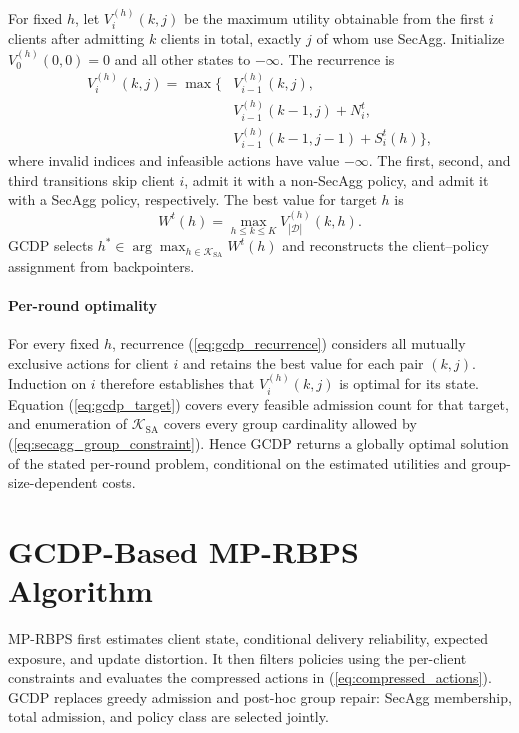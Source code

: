 \documentclass[preprint,12pt]{elsarticle}
\begin{document}
For fixed \(h\), let \(V_i^{(h)}(k,j)\) be the maximum utility obtainable from the first \(i\) clients after admitting \(k\) clients in total, exactly \(j\) of whom use SecAgg. Initialize \(V_0^{(h)}(0,0)=0\) and all other states to \(-\infty\). The recurrence is
\begin{equation}
\begin{aligned}
V_i^{(h)}(k,j)=\max\big\{&
V_{i-1}^{(h)}(k,j),\\
&V_{i-1}^{(h)}(k-1,j)+N_i^t,\\
&V_{i-1}^{(h)}(k-1,j-1)+S_i^t(h)
\big\},
\end{aligned}
\label{eq:gcdp_recurrence}
\end{equation}
where invalid indices and infeasible actions have value \(-\infty\). The first, second, and third transitions skip client \(i\), admit it with a non-SecAgg policy, and admit it with a SecAgg policy, respectively. The best value for target \(h\) is
\begin{equation}
	W^t(h)=\max_{h\leq k\leq K}V_{|\mathcal D|}^{(h)}(k,h).
	\label{eq:gcdp_target}
\end{equation}
GCDP selects \(h^*\in\arg\max_{h\in\mathcal K_{\mathrm{SA}}}W^t(h)\) and reconstructs the client--policy assignment from backpointers.

\paragraph{Per-round optimality}
For every fixed \(h\), recurrence (\ref{eq:gcdp_recurrence}) considers all mutually exclusive actions for client \(i\) and retains the best value for each pair \((k,j)\). Induction on \(i\) therefore establishes that \(V_i^{(h)}(k,j)\) is optimal for its state. Equation (\ref{eq:gcdp_target}) covers every feasible admission count for that target, and enumeration of \(\mathcal K_{\mathrm{SA}}\) covers every group cardinality allowed by (\ref{eq:secagg_group_constraint}). Hence GCDP returns a globally optimal solution of the stated per-round problem, conditional on the estimated utilities and group-size-dependent costs.

\section{GCDP-Based MP-RBPS Algorithm}

MP-RBPS first estimates client state, conditional delivery reliability, expected exposure, and update distortion. It then filters policies using the per-client constraints and evaluates the compressed actions in (\ref{eq:compressed_actions}). GCDP replaces greedy admission and post-hoc group repair: SecAgg membership, total admission, and policy class are selected jointly.
\end{document}
